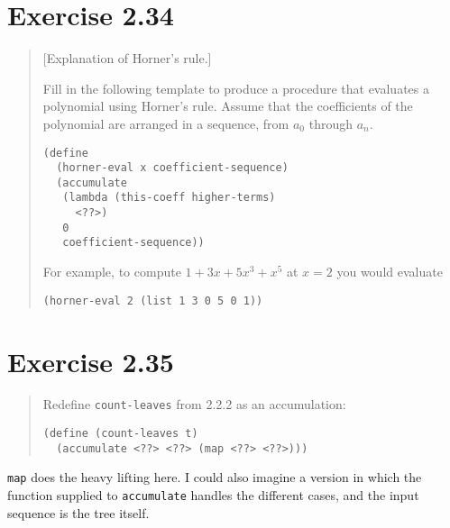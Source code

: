 \documentclass{article}
\begin{document}
\section{Exercise 2.34}
\begin{quote}
	[Explanation of Horner's rule.]

    Fill in the following template to produce a procedure that evaluates a
    polynomial using Horner's rule. Assume that the coefficients of the
    polynomial are arranged in a sequence, from $a_0$ through $a_n$.
    \begin{lstlisting}
(define
  (horner-eval x coefficient-sequence)
  (accumulate
   (lambda (this-coeff higher-terms)
     <??>)
   0
   coefficient-sequence))
    \end{lstlisting}
For example, to compute $1+3x+5x^3+x^5$ at $x=2$ you would evaluate
    \begin{lstlisting}
(horner-eval 2 (list 1 3 0 5 0 1))
    \end{lstlisting}
\end{quote}



\section{Exercise 2.35}
\begin{quote}
	Redefine \texttt{count-leaves} from 2.2.2 as an accumulation:

	\begin{lstlisting}
(define (count-leaves t)
  (accumulate <??> <??> (map <??> <??>)))
	\end{lstlisting}
\end{quote}

\texttt{map} does the heavy lifting here. I could also imagine a version in
which the function supplied to \texttt{accumulate} handles the different cases,
and the input sequence is the tree itself.

\end{document}
